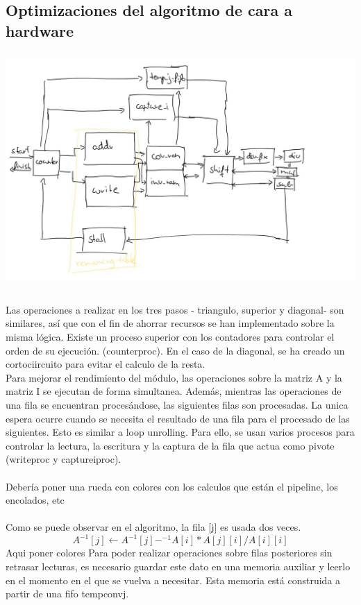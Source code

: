 \subsection{Optimizaciones del algoritmo de cara a hardware}
\includegraphics[height=3.5in]{figures/gauss.jpg}
\\
\\
Las operaciones a realizar en los tres pasos - triangulo, superior y diagonal- son similares, así que con el fin de ahorrar recursos se han implementado sobre la misma lógica. Existe un proceso superior con los contadores para controlar el orden de su ejecución. (counterproc). En el caso de la diagonal, se ha creado un cortociircuito para evitar el calculo de la resta.
\\
Para mejorar el rendimiento del módulo, las operaciones sobre la matriz A y la matriz I se ejecutan de forma simultanea. Además, mientras las operaciones de una fila se encuentran procesándose, las siguientes filas son procesadas. La unica espera ocurre cuando se necesita el resultado de una fila para el procesado de las siguientes. Esto es similar a loop unrolling. Para ello, se usan varios procesos para controlar la lectura, la escritura y la captura de la fila que actua como pivote (writeproc y captureiproc). 
\\
\\
Debería poner una rueda con colores con los calculos que están el pipeline, los encolados, etc
\\
\\
Como se puede observar en el algoritmo, la fila [j] es usada dos veces.
\[A^{-1}[j] \gets A^{-1}[j]-^{-1}A[i]*A[j][i]/A[i][i]\]
Aqui poner colores
Para poder realizar operaciones sobre filas posteriores sin retrasar lecturas, es necesario guardar este dato en una memoria auxiliar y leerlo en el momento en el que se vuelva a necesitar. Esta memoria está construida a partir de una fifo tempconvj.
